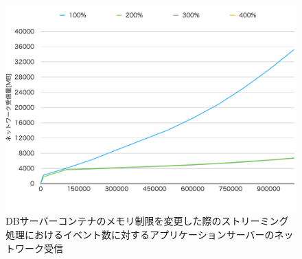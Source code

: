 \documentclass[../../../../../main]{subfiles}
\begin{document}
    \begin{figure}[H]
        \centering
        \includegraphics[width=12cm]{graph}
        \caption{DBサーバーコンテナのメモリ制限を変更した際のストリーミング処理におけるイベント数に対するアプリケーションサーバーのネットワーク受信}
        \label{fig:stream-change-db-memory-limit-app-net-in-app_4_8192-db_400}
    \end{figure}
\end{document}
